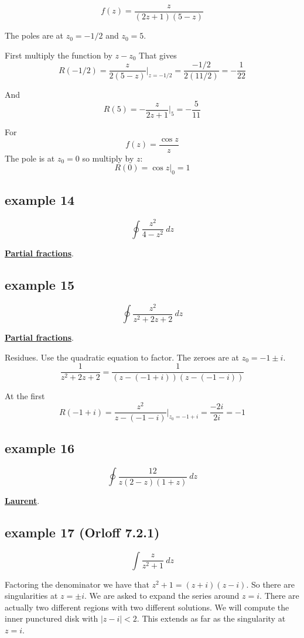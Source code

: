 \documentclass[11pt, oneside]{article}
\begin{document}
\[ f(z) = \frac{z}{(2z + 1)(5 - z)} \]

The poles are at $z_0 = -1/2$ and $z_0 = 5$.

First multiply the function by $z - z_0$  That gives
\[  R(-1/2) = \frac{z}{2 (5 - z)} \bigg |_{z = -1/2}  = \frac{-1/2}{2(11/2)} = -\frac{1}{22} \]

And
\[ R(5) = -\frac{z}{2z + 1} \bigg |_5 = - \frac{5}{11} \]

For
\[ f(z) = \frac{\cos z}{z} \]
The pole is at $z_0 = 0$ so multiply by $z$:
\[ R(0) = \cos z \bigg |_0 = 1 \]

\subsection*{example 14}
\[ \oint \frac{z^2}{4 - z^2} \ dz \]

\hyperref[sec:ex14PF]{\textbf{Partial fractions}}.

\subsection*{example 15}
\[ \oint \frac{z^2}{z^2 + 2z + 2} \ dz \]

\hyperref[sec:ex15PF]{\textbf{Partial fractions}}.

Residues.  Use the quadratic equation to factor.  The zeroes are at $z_0 = -1 \pm i$.  
\[ \frac{1}{z^2 + 2z + 2} = \frac{1}{(z - (-1 + i))(z - (-1 - i) )}  \]

At the first
\[ R(-1 + i) = \frac{z^2}{z - (-1 - i)} \bigg |_{z_0 = -1 + i} = \frac{-2i}{2i} = - 1 \]

\subsection*{example 16}
\[ \oint \frac{12}{z(2 - z)(1 + z)} \ dz \]

\hyperref[sec:ex16L]{\textbf{Laurent}}.

\subsection*{example 17 (Orloff 7.2.1)}
\[ \int \frac{z}{z^2 + 1} \ dz \]

Factoring the denominator we have that $z^2 + 1 = (z + i)(z - i)$.  So there are singularities at $z = \pm i$.  We are asked to expand the series around $z =i$.  There are actually two different regions with two different solutions.  We will compute the inner punctured disk with $|z - i| < 2$.  This extends as far as the singularity at $z = i$.
\end{document}
